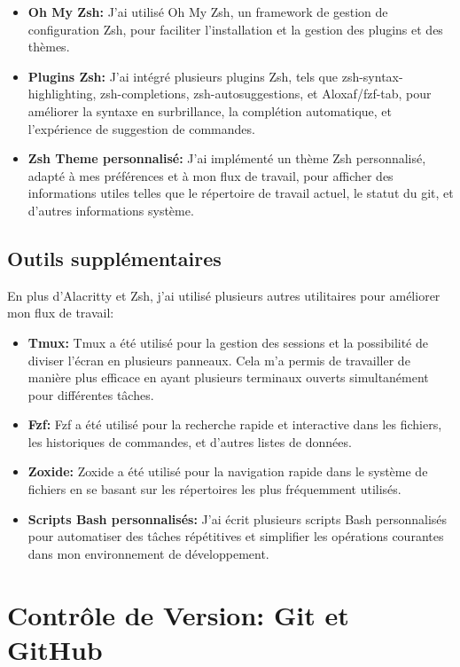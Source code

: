 \begin{itemize}
  \item \textbf{Oh My Zsh: }J'ai utilisé Oh My Zsh, un framework de gestion de configuration Zsh, pour faciliter l'installation et la gestion des plugins et des thèmes.
  \item \textbf{Plugins Zsh: }J'ai intégré plusieurs plugins Zsh, tels que zsh-syntax-highlighting, zsh-completions, zsh-autosuggestions, et Aloxaf/fzf-tab, pour améliorer la syntaxe en surbrillance, la complétion automatique, et l'expérience de suggestion de commandes.
  \item \textbf{Zsh Theme personnalisé: }J'ai implémenté un thème Zsh personnalisé, adapté à mes préférences et à mon flux de travail, pour afficher des informations utiles telles que le répertoire de travail actuel, le statut du git, et d'autres informations système.
\end{itemize}

\subsection{Outils supplémentaires}

\hspace{16pt}En plus d'Alacritty et Zsh, j'ai utilisé plusieurs autres utilitaires pour améliorer mon flux de travail:

\begin{itemize}
  \item \textbf{Tmux: }Tmux a été utilisé pour la gestion des sessions et la possibilité de diviser l'écran en plusieurs panneaux. Cela m'a permis de travailler de manière plus efficace en ayant plusieurs terminaux ouverts simultanément pour différentes tâches.
  \item \textbf{Fzf: }Fzf a été utilisé pour la recherche rapide et interactive dans les fichiers, les historiques de commandes, et d'autres listes de données.
  \item \textbf{Zoxide: }Zoxide a été utilisé pour la navigation rapide dans le système de fichiers en se basant sur les répertoires les plus fréquemment utilisés.
  \item \textbf{Scripts Bash personnalisés: }J'ai écrit plusieurs scripts Bash personnalisés pour automatiser des tâches répétitives et simplifier les opérations courantes dans mon environnement de développement.
\end{itemize}


\section{Contrôle de Version: Git et GitHub}

